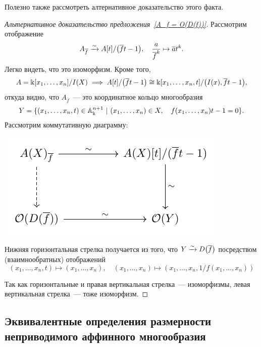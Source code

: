 	Полезно также рассмотреть алтернативное доказательство этого факта. 

	\begin{proof}[Альтернативное доказательство предложения~\ref{A_f = O(D(f))}]
		Рассмотрим отображение 
		\[
			A_{\overline{f}} \xrightarrow{\sim} A[t]/\lr*{\overline{f}t - 1}, \quad \frac{a}{\overline{f}^k} \mapsto \overline{a} t^k.
		\]
		Легко видеть, что это изоморфизм. Кроме того, 
	   \[
	    	A = \Bbbk[x_1, \ldots, x_n]/I(X) \implies A[t]/\lr*{\overline{f}t - 1} \cong \Bbbk[x_1, \ldots, x_n, t]/\lr*{I(x), \overline{f}t - 1},
	    \] 
	    откуда видно, что $A_{\overline{f}}$~--- это координатное кольцо многообразия
	    \[
	    	Y = \{ (x_1, \ldots, x_n, t) \in \AA_{\Bbbk}^{n + 1} \ \vert \ (x_1, \ldots, x_n) \in X, \quad f(x_1, \ldots, x_n) t - 1 = 0 \}. 
	    \]
	    Рассмотрим коммутативную диаграмму: 
	    \begin{center}
	    	\includegraphics{lectures/5/pictures/cd_1.pdf}
	    \end{center}

	    Нижняя горизонтальная стрелка получается из того, что $Y \xrightarrow{\sim} D\lr*{\overline{f}}$ посредством (взаимнообратных) отображений 
	    \[ 
	    	(x_1, \ldots, x_n, t) \mapsto (x_1, \ldots, x_n), \quad (x_1, \ldots, x_n) \mapsto (x_1, \ldots, x_n, 1/f(x_1, \ldots, x_n))
	    \]

	    Так как горизонтальные и правая вертикальная стрелка~--- изоморфизмы, левая вертикальная стрелка~--- тоже изоморфизм. 


	\end{proof}
	   
	  \subsection{Эквивалентные определения размерности неприводимого аффинного многообразия}

